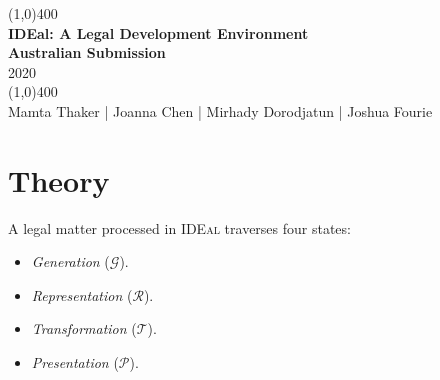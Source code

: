 \documentclass{article}
\date{\today}
\numberwithin{equation}{section}
\newcommand{\ideal}{\textsc{IDEal }}
\begin{document}
	\pagecolor{IdealColour}

	\begin{titlepage}
	\begin{center}
		\color{white}
		\vfill
		\line(1,0){400}\\[1mm]
			\huge{\textbf{IDEal: A Legal Development Environment}}\\
			\Large{\textbf{Australian Submission}}\\
			2020 \\
		\line(1,0){400}\\[3mm]
		\vfill
		\large{Mamta Thaker | Joanna Chen | Mirhady Dorodjatun | Joshua Fourie}
	\end{center}
	\end{titlepage}

	\pagecolor{white}

	\tableofcontents
	\thispagestyle{empty}
	\clearpage


\pagebreak
\part{Theory}

A legal matter processed in \ideal traverses four states:
\begin{itemize}
	\item \textit{Generation} ($\mathcal{G}$). 
	\item \textit{Representation} ($\mathcal{R}$).
	\item \textit{Transformation} ($\mathcal{T}$). 
	\item \textit{Presentation} ($\mathcal{P}$).
\end{itemize}
	
\end{document}
